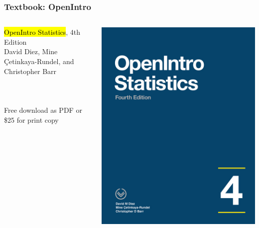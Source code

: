 \documentclass[slidestop,compress,mathserif]{beamer}
\begin{document}
\begin{frame}
	\frametitle{Textbook: OpenIntro}
	\begin{columns}
		\begin{minipage}[t]{\linewidth}
		\vspace{0pt}
			\hl{OpenIntro Statistics}, 4th Edition \\
			David Diez, Mine \c{C}etinkaya-Rundel, and Christopher Barr \\
			\\
			 \\
			\\
			Free download as PDF or \$25 for print copy
		\end{minipage}
		\begin{minipage}[t]{\linewidth}
		\vspace{0pt}
		\centering
		\includegraphics[width=0.9\columnwidth]{openintro_cover.jpeg}
		\end{minipage}
	\end{columns}
\end{frame}
\end{document}
